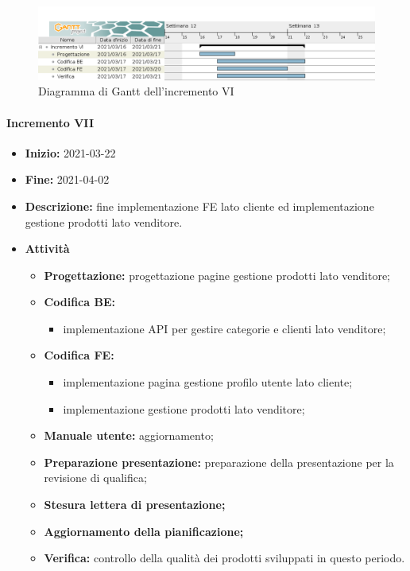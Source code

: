 \begin{figure}[H]
    \centering
    \includegraphics[width=1\linewidth]{res/images/pianificazione/incremento_6.png}
    \caption{Diagramma di Gantt dell'incremento VI}
    \label{fig:_Gantt incremento VI}
\end{figure}

\paragraph[Incremento VII]{Incremento VII}
\begin{itemize}
    \item [] \textbf{Inizio:} 2021-03-22
    \item [] \textbf{Fine:} 2021-04-02
    \item [] \textbf{Descrizione:} fine implementazione FE lato cliente ed implementazione gestione prodotti lato venditore.
    \item [] \textbf{Attività}
          \begin{itemize}
              \item \textbf{Progettazione:} progettazione pagine gestione prodotti lato venditore;
              \item \textbf{Codifica BE:}
                    \begin{itemize}
                        \item implementazione API per gestire categorie e clienti lato venditore;
                    \end{itemize}
              \item \textbf{Codifica FE:}
                    \begin{itemize}
                        \item implementazione pagina gestione profilo utente lato cliente;
                        \item implementazione gestione prodotti lato venditore;
                    \end{itemize}
              \item \textbf{Manuale utente:} aggiornamento;
              \item \textbf{Preparazione presentazione:} preparazione della presentazione per la revisione di qualifica;
              \item \textbf{Stesura lettera di presentazione;}
              \item \textbf{Aggiornamento della pianificazione;}
              \item \textbf{Verifica:} controllo della qualità dei prodotti sviluppati in questo periodo.
          \end{itemize}
\end{itemize}

